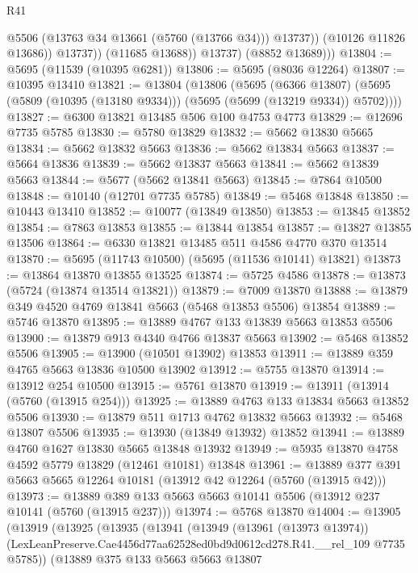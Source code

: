 \begin{lexlean}{R41}
\begin{coremodule}
                      @5506
                      (@13763 @34 @13661 (@5760 (@13766 @34)))
                      @13737))
                  (@10126 @11826 @13686))
                @13737))
            (@11685 @13688))
          @13737)
        (@8852 @13689)))
@13804 := @5695 (@11539 (@10395 @6281))
@13806 := @5695 (@8036 @12264)
@13807 := @10395 @13410
@13821 := @13804
    (@13806
      (@5695
        (@6366 @13807)
        (@5695 (@5809 (@10395 (@13180 @9334))) (@5695 (@5699 (@13219 @9334)) @5702))))
@13827 := @6300 @13821 @13485 @506 @100 @4753 @4773
@13829 := @12696 @7735 @5785
@13830 := @5780 @13829
@13832 := @5662 @13830 @5665
@13834 := @5662 @13832 @5663
@13836 := @5662 @13834 @5663
@13837 := @5664 @13836
@13839 := @5662 @13837 @5663
@13841 := @5662 @13839 @5663
@13844 := @5677 (@5662 @13841 @5663)
@13845 := @7864 @10500
@13848 := @10140 (@12701 @7735 @5785)
@13849 := @5468 @13848
@13850 := @10443 @13410
@13852 := @10077 (@13849 @13850)
@13853 := @13845 @13852
@13854 := @7863 @13853
@13855 := @13844 @13854
@13857 := @13827 @13855 @13506
@13864 := @6330 @13821 @13485 @511 @4586 @4770 @370 @13514
@13870 := @5695 (@11743 @10500) (@5695 (@11536 @10141) @13821)
@13873 := @13864 @13870 @13855 @13525
@13874 := @5725 @4586
@13878 := @13873 (@5724 (@13874 @13514 @13821))
@13879 := @7009 @13870
@13888 := @13879 @349 @4520 @4769 @13841 @5663 (@5468 @13853 @5506) @13854
@13889 := @5746 @13870
@13895 := @13889 @4767 @133 @13839 @5663 @13853 @5506
@13900 := @13879 @913 @4340 @4766 @13837 @5663
@13902 := @5468 @13852 @5506
@13905 := @13900 (@10501 @13902) @13853
@13911 := @13889 @359 @4765 @5663 @13836 @10500 @13902
@13912 := @5755 @13870
@13914 := @13912 @254 @10500
@13915 := @5761 @13870
@13919 := @13911 (@13914 (@5760 (@13915 @254)))
@13925 := @13889 @4763 @133 @13834 @5663 @13852 @5506
@13930 := @13879 @511 @1713 @4762 @13832 @5663
@13932 := @5468 @13807 @5506
@13935 := @13930 (@13849 @13932) @13852
@13941 := @13889 @4760 @1627 @13830 @5665 @13848 @13932
@13949 := @5935 @13870 @4758 @4592 @5779 @13829 (@12461 @10181) @13848
@13961 := @13889 @377 @391 @5663 @5665 @12264 @10181 (@13912 @42 @12264 (@5760 (@13915 @42)))
@13973 := @13889 @389 @133 @5663 @5663 @10141 @5506 (@13912 @237 @10141 (@5760 (@13915 @237)))
@13974 := @5768 @13870
@14004 := @13905
    (@13919
      (@13925
        (@13935
          (@13941
            (@13949
              (@13961 (@13973 @13974))
              (LexLeanPreserve.Cae4456d77aa62528ed0bd9d0612cd278.R41.__rel_109 @7735 @5785))
            (@13889
              @375
              @133
              @5663
              @5663
              @13807

\end{coremodule}
\end{lexlean}
